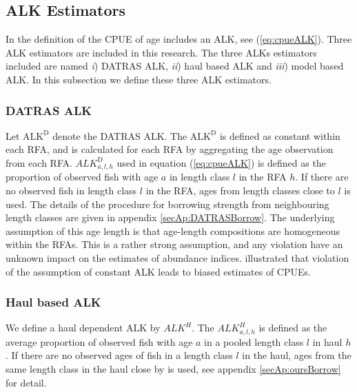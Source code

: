 \documentclass[a4paper 12pt]{article}
\numberwithin{equation}{section}
\begin{document}
 

\subsection{ALK Estimators}

In the definition of the CPUE of age includes an ALK, see (\ref{eq:cpueALK}). Three ALK estimators are included in this research. The three ALKs estimators included are named \textit{i}) DATRAS ALK, \textit{ii}) haul based ALK and \textit{iii}) model based ALK. In this subsection we define these three ALK estimators. 

\subsubsection{DATRAS ALK}
\label{sec:datrasalkestimator}
Let $\text{ALK}^{\text{D}}$ denote the DATRAS ALK. The $\text{ALK}^{\text{D}}$ is defined as constant within each RFA, and is calculated for each RFA by aggregating the age observation from each RFA. $ALK^{\text{D}}_{a,l,h}$ used in equation (\ref{eq:cpueALK}) is defined as the proportion of observed fish with age $a$ in length class $l$ in the RFA $h$. If there are no observed fish in length class $l$ in the RFA, ages from length classes close to $l$ is used. The details of the procedure for borrowing strength from neighbouring length classes are given in appendix \ref{secAp:DATRASBorrow}. The underlying assumption of this age length  is that age-length compositions are homogeneous within the RFAs. This is a rather strong assumption, and any violation have an unknown impact on the estimates of abundance indices. \citet{aanes2015efficient} illustrated that violation of the assumption of constant ALK leads to biased estimates of CPUEs. 

\subsubsection{Haul based ALK}
\label{sec:haulestimator}
We define a haul dependent ALK  by  $ALK^{H}$. The $ALK^{H}_{a,l,h}$ is defined as the average proportion of observed fish with age $a$ in a pooled length class $l$ in haul $h$. If there are no observed ages of fish in a length class $l$ in the haul, ages from the same length class in the haul close by is used, see appendix \ref{secAp:oursBorrow} for detail. 
\end{document}
